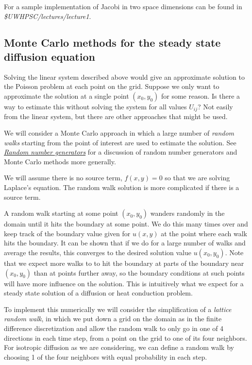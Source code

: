 \documentclass[letterpaper,10pt,english]{sphinxmanual}
\begin{document}
For a sample implementation of Jacobi in two space dimensions can be found
in \emph{\$UWHPSC/lectures/lecture1}.


\subsection{Monte Carlo methods for the steady state diffusion equation}
\label{poisson:poisson-mc}\label{poisson:monte-carlo-methods-for-the-steady-state-diffusion-equation}
Solving the linear system described above would give an approximate solution
to the Poisson problem at each point on the grid.  Suppose we only want to
approximate the solution at a single point $(x_0,y_0)$ for some reason.
Is there a way
to estimate this without solving the system for all values $U_{ij}$?
Not easily from the linear system, but there are other approaches that might
be used.

We will consider a Monte Carlo approach in which a large number of
\emph{random walks} starting from the point of interest are used to estimate the
solution.  See {\hyperref[random:random]{\emph{Random number generators}}} for a discussion of random number generators
and Monte Carlo methods more generally.

We will assume there is no source term, $f(x,y)=0$ so that we are
solving Laplace's equation.  The random walk solution is more complicated if
there is a source term.

A random walk starting at some point $(x_0,y_0)$ wanders randomly in
the domain until it hits the boundary at some point.  We do this many times
over and keep track of the boundary value given for $u(x,y)$ at the
point where each walk hits the boundary.  It can be shown that if we do for
a large number of walks and average the results, this converges to the
desired solution value $u(x_0,y_0)$.  Note that we expect more walks
to to hit the boundary at parts of the boundary near $(x_0,y_0)$ than
at points further away, so the boundary conditions at such points will have
more influence on the solution.  This is intuitively what we expect for a
steady state solution of a diffusion or heat conduction problem.

To implement this numerically we will consider the simplification
of a \emph{lattice random walk}, in which we put down a grid on the domain as in
the finite difference discretization and allow the random walk to only go in
one of 4 directions in each time step, from a point on the grid to one of
its four neighbors.  For isotropic diffusion as we are considering,
we can define a random walk by choosing 1 of the four
neighbors with equal probability in each step.
\end{document}
